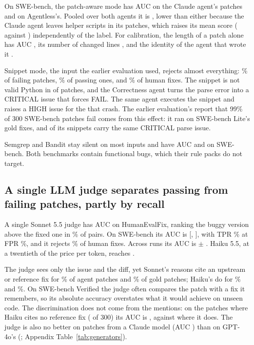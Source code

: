 On SWE-bench, the patch-aware mode has AUC \nPaClaudeAuc{} on the Claude agent's patches and \nPaGptAuc{} on Agentless's. Pooled over both agents it is \nSweCvDiffAuc{}, lower than either because the Claude agent leaves helper scripts in its patches, which raises its mean score (\nPaClaudeScore{} against \nPaGptScore) independently of the label. For calibration, the length of a patch alone has AUC \nTrivLen, its number of changed lines \nTrivLines, and the identity of the agent that wrote it \nTrivGen.

Snippet mode, the input the earlier evaluation used, rejects almost everything: \nSweCvTpr\% of failing patches, \nSweCvFpr\% of passing ones, and \nGoldCv\% of human fixes. The snippet is not valid Python in \nSweSyntaxCrit{} of \nSweNItems{} patches, and the Correctness agent turns the parse error into a CRITICAL issue that forces FAIL. The same agent executes the snippet and raises a HIGH issue for the \nSweExecHigh{} that crash. The earlier evaluation's report that 99\% of 300 SWE-bench patches fail comes from this effect: it ran on SWE-bench Lite's gold fixes, and \nLiteSyntax{} of its \nLiteN{} snippets carry the same CRITICAL parse issue.

Semgrep and Bandit stay silent on most inputs and have AUC \nSweSemgrepAuc{} and \nSweBanditAuc{} on SWE-bench. Both benchmarks contain functional bugs, which their rule packs do not target.

\subsection{A single LLM judge separates passing from failing patches, partly by recall}

A single Sonnet 5.5 judge has AUC \nHefSonnetAuc{} on HumanEvalFix, ranking the buggy version above the fixed one in \nHefSonnetPairWin\% of pairs. On SWE-bench its AUC is \nSweSonnetAuc{} [\nSweSonnetAucLo, \nSweSonnetAucHi], with TPR \nSweSonnetTpr\% at FPR \nSweSonnetFpr\%, and it rejects \nGoldSonnet\% of human fixes. Across \nSonnetRuns{} runs its AUC is \nSonnetRunMean{} $\pm$ \nSonnetRunSd. Haiku 5.5, at a twentieth of the price per token, reaches \nSweHaikuAuc.

The judge sees only the issue and the diff, yet Sonnet's reasons cite an upstream or reference fix for \nSonnetRecallAgent\% of agent patches and \nSonnetRecallGold\% of gold patches; Haiku's do for \nHaikuRecallAgent\% and \nHaikuRecallGold\%. On SWE-bench Verified the judge often compares the patch with a fix it remembers, so its absolute accuracy overstates what it would achieve on unseen code. The discrimination does not come from the mentions: on the patches where Haiku cites no reference fix (\nHaikuCleanN{} of 300) its AUC is \nHaikuCleanAuc, against \nHaikuMentionedAuc{} where it does. The judge is also no better on patches from a Claude model (AUC \nGenClaudeSonnetAuc) than on GPT-4o's (\nGenGptSonnetAuc; Appendix Table~\ref{tab:generators}).

